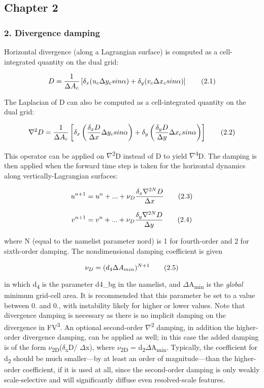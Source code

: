 \subsection*{Chapter 2}

\subsubsection*{2. Divergence damping}

Horizontal divergence (along a Lagrangian surface) is computed as a cell-\/ integrated quantity on the dual grid\+:

\[ D = \frac{1}{\Delta A_c} \left[ \delta_x (u_c \Delta y_c sin\alpha) + \delta_y (v_c \Delta x_c sin \alpha) \right] \\ \tag {2.1} \]

The Laplacian of D can also be computed as a cell-\/integrated quantity on the dual grid\+:

\[ \nabla^2 D = \frac{1}{\Delta A_c} \left[ \delta_x \left(\frac{\delta_x D}{\Delta x} \Delta y_c sin\alpha \right) + \delta_y \left(\frac{\delta_y D}{\Delta y} \Delta x_c sin \alpha \right) \right] \\ \tag {2.2} \]

This operator can be applied on {$\nabla$}\textsuperscript{2}D instead of D to yield {$\nabla$}\textsuperscript{4}D. The damping is then applied when the forward time step is taken for the horizontal dynamics along vertically-\/\+Lagrangian surfaces\+:

\[ u^{n+1} = u^n + . . . + \nu_D \frac{\delta_x \nabla^{2N} D}{\Delta x} \\ \tag {2.3} \]

\[ v^{n+1} = v^n + . . . + \nu_D \frac{\delta_y \nabla^{2N} D}{\Delta y} \\ \tag {2.4} \]

where N (equal to the namelist parameter {\ttfamily nord}) is 1 for fourth-\/order and 2 for sixth-\/order damping. The nondimensional damping coefficient is given

\[ \nu_D = (d_4\Delta A_{min} )^{N+1} \\ \tag {2.5} \]

in which d\textsubscript{4} is the parameter {\ttfamily d4\+\_\+bg} in the namelist, and {$\Delta$}A\textsubscript{min} is the {\itshape global} minimum grid-\/cell area. It is recommended that this parameter be set to a value between 0. and 0., with instability likely for higher or lower values. Note that divergence damping is necessary as there is no implicit damping on the divergence in FV\textsuperscript{3}. An optional second-\/order {$\nabla$}\textsuperscript{2} damping, in addition the higher-\/order divergence damping, can be applied as well; in this case the added damping is of the form {$\nu$}\textsubscript{2D}({$\delta$}\textsubscript{x}D/ {$\Delta$}x), where {$\nu$}\textsubscript{2D} = d\textsubscript{2}{$\Delta$}A\textsubscript{min}. Typically, the coefficient for d\textsubscript{2} should be much smaller—by at least an order of magnitude—than the higher-\/order coefficient, if it is used at all, since the second-\/order damping is only weakly scale-\/selective and will significantly diffuse even resolved-\/scale features.

